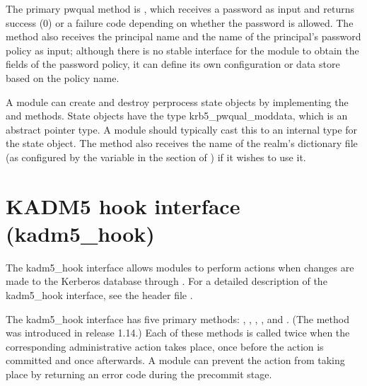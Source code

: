 \documentclass[letterpaper,10pt,english]{sphinxmanual}
\begin{document}
\sphinxAtStartPar
The primary pwqual method is , which receives a password as
input and returns success (0) or a  failure code
depending on whether the password is allowed.  The  method
also receives the principal name and the name of the principal’s
password policy as input; although there is no stable interface for
the module to obtain the fields of the password policy, it can define
its own configuration or data store based on the policy name.

\sphinxAtStartPar
A module can create and destroy per\sphinxhyphen{}process state objects by
implementing the  and  methods.  State objects have
the type krb5\_pwqual\_moddata, which is an abstract pointer type.  A
module should typically cast this to an internal type for the state
object.  The  method also receives the name of the realm’s
dictionary file (as configured by the  variable in the
 section of ) if it wishes to use
it.


\section{KADM5 hook interface (kadm5\_hook)}
\label{\detokenize{plugindev/kadm5_hook:kadm5-hook-interface-kadm5-hook}}\label{\detokenize{plugindev/kadm5_hook:kadm5-hook-plugin}}\label{\detokenize{plugindev/kadm5_hook::doc}}
\sphinxAtStartPar
The kadm5\_hook interface allows modules to perform actions when
changes are made to the Kerberos database through .
For a detailed description of the kadm5\_hook interface, see the header
file .

\sphinxAtStartPar
The kadm5\_hook interface has five primary methods: ,
, , , and .  (The 
method was introduced in release 1.14.)  Each of these methods is
called twice when the corresponding administrative action takes place,
once before the action is committed and once afterwards.  A module can
prevent the action from taking place by returning an error code during
the pre\sphinxhyphen{}commit stage.
\end{document}
